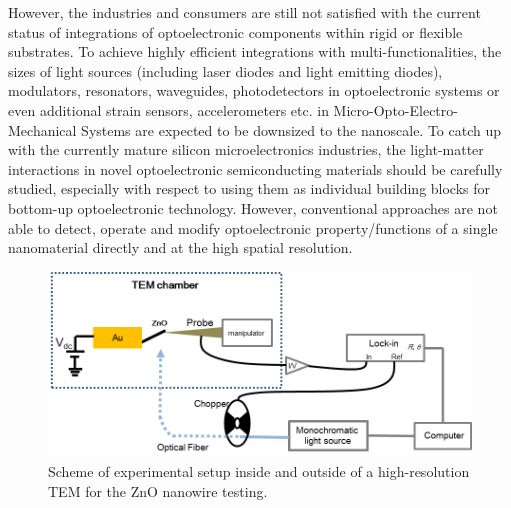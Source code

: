 However, the industries and consumers are still not satisfied with the current status of integrations of optoelectronic components within rigid or flexible substrates.\cite{C.2009, T.2004, D.2004}
To achieve highly efficient integrations with multi-functionalities, the sizes of light sources (including laser diodes and light emitting diodes), modulators, resonators, waveguides, photodetectors in optoelectronic systems or even additional strain sensors, accelerometers etc. in Micro-Opto-Electro-Mechanical Systems are expected to be downsized to the nanoscale.\cite{Park2007} 
To catch up with the currently mature silicon microelectronics industries, the light-matter interactions in novel optoelectronic semiconducting materials should be carefully studied, especially with respect to using them as individual building blocks for bottom-up optoelectronic technology. 
However, conventional approaches are not able to detect, operate and modify optoelectronic property/functions of a single nanomaterial directly and at the high spatial resolution. 

\begin{figure}  
\includegraphics[width=\textwidth]{figures/figure5_1}
\caption[Experimental setup for Zinc Oxide.]{Scheme of experimental setup inside and outside of a high-resolution TEM for the ZnO nanowire testing.
\label{fig:5_1}}
\end{figure}

